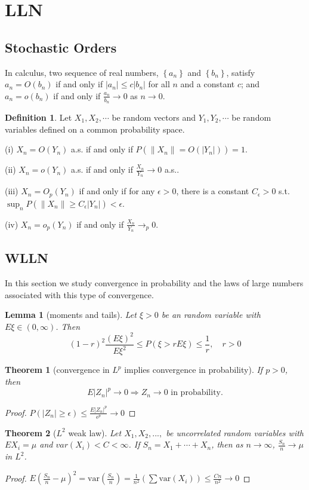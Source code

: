 \documentclass{article}
\newtheorem{Thm}{Theorem}[section]
\newtheorem{Lem}{Lemma}[section]
\theoremstyle{definition}
\newtheorem{Def}{Definition}[section]
\begin{document}
\section{LLN}
\subsection{Stochastic Orders}
In calculus, two sequence of real numbers, $\left\{a_n\right\}$ and $\left\{b_n\right\}$, satisfy $a_n=O(b_n)$ if and only if $\left|a_n\right|\le c\left|b_n\right|$ for all $n$ and a constant $c$; and $a_n=o(b_n)$ if and only if $\frac{a_n}{b_n}\to 0$ as $n\to0$.
\begin{Def}
Let $X_1,X_2,\cdots$ be random vectors and $Y_1,Y_2,\cdots$ be random variables defined on a common probability space.\par
(i) $X_n=O(Y_n)$ a.s. if and only if $P(\left \| X_n \right \| =O(\left | Y_n \right | ))=1$.\par
(ii) $X_n=o(Y_n)$ a.s. if and only if $\frac{X_n}{Y_n}\to 0$ a.s..\par
(iii) $X_n=O_p(Y_n)$ if and only if for any $\epsilon>0$, there is a constant $C_\epsilon>0$ s.t. $\sup_nP(\left \| X_n \right \| \ge C_\epsilon \left | Y_n \right | )<\epsilon$.\par
(iv) $X_n=o_p(Y_n)$ if and only if $\frac{X_n}{Y_n}\to_p0$.
\end{Def}
\subsection{WLLN}
In this section we study convergence in probability and the laws of large numbers associated with this type of convergence.
\begin{Lem}[moments and tails]
    Let $\xi>0$ be an random variable with $E\xi\in (0,\infty)$. Then 
    \[(1-r)^2\frac{(E\xi)^2}{E\xi^2}\le P(\xi>rE\xi)\le \frac{1}{r},\quad r>0\]
\end{Lem}
\begin{Thm}[convergence in $L^p$ implies convergence in probability]
If $p>0$, then \[E\left | Z_n \right | ^p\to 0 \Longrightarrow Z_n\longrightarrow 0\text{ in probability.}\]
\end{Thm}
\begin{proof}
$P(\left | Z_n \right |\ge\epsilon)\le\frac{E\left | Z_n \right | ^p}{\epsilon^p}\to 0$
\end{proof}
\begin{Thm}[$L^2$ weak law]
Let $X_1,X_2,...,$ be uncorrelated random variables with $EX_i=\mu$ and $var(X_i)<C<\infty$. If $S_n=X_1+\cdots+X_n$, then as $n\to\infty$, $\frac{S_n}{n}\longrightarrow \mu$ in $L^2$.
\end{Thm}
\begin{proof}
$E(\frac{S_n}{n}-\mu)^2=\text{var}(\frac{S_n}{n})=\frac{1}{n^2}(\sum\text{var}(X_i))\le \frac{Cn}{n^2}\to 0$
\end{proof}
\end{document}
